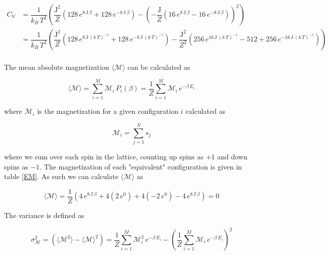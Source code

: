 \documentclass[a4paper, fontsize=11pt]{article}
\begin{document}
\begin{align}
C_{V} &= \dfrac{1}{k_{B} \, T^2} \left( \dfrac{\text{J}^2}{Z} \left( 128 \, e^{8 \, \text{J} \, \beta} + 128 \, e^{-8 \, \text{J} \, \beta} \right) - \left(-\dfrac{\text{J}}{Z} \left(16 \, e^{8 \, \text{J} \, \beta} - 16 \, e^{-8 \, \text{J} \, \beta} \right) \right)^2 \right)
\\
&= 
\dfrac{1}{k_{B} \, T^2} \left( \dfrac{\text{J}^2}{Z} \left( 128 \, e^{8 \, \text{J} \, (k \, T)^{-1}} + 128 \, e^{-8 \, \text{J} \, (k \, T)^{-1}} \right) 
- 
\dfrac{\text{J}^2}{Z^2} \left(256 \, e^{16 \, \text{J} \, (k \, T)^{-1}} - 512 + 256 \, e^{-16 \, \text{J} \, (k \, T)^{-1}} \right) \right) 
\end{align}



\paragraph{}
The mean absolute magnetization $\langle \mathcal{M} \rangle$ can be calculated as

\begin{equation}
\langle \mathcal{M} \rangle = \sum^M_{i=1} \mathcal{M}_{i} \, P_{i}(\beta) = \dfrac{1}{Z} \sum^M_{i=1} \mathcal{M}_{i} \, e^{-\beta \, E_{i}}
\end{equation}

where $\mathcal{M}_{i}$ is the magnetization for a given configuration $i$ calculated as

\begin{equation}
\mathcal{M}_{i} = \sum^N_{j=1} s_{j}
\end{equation}

where we sum over each spin in the lattice, counting up spins as $+1$ and down spins as $-1$. The magnetization of each "equivalent" configuration is given in table \ref{EM}. As such we can calculate $\langle \mathcal{M} \rangle$ as

\begin{equation}
\langle \mathcal{M} \rangle = \dfrac{1}{Z} \left( 4 \, e^{8 \, \text{J} \, \beta} + 4 (2 \, e^0) + 4 ( -2 \, e^0) -4 \, e^{8 \, \text{J} \, \beta} \right) = 0
\end{equation}

The variance is defined as 

\begin{equation}
\sigma^2_{\mathcal{M}} = \left( \langle \mathcal{M}^2 \rangle - \langle \mathcal{M} \rangle^2 \right) = \dfrac{1}{Z} \sum^M_{i=1} \mathcal{M}_{i}^2 \, e^{-\beta \, E_{i}} - \left( \dfrac{1}{Z} \sum^M_{i=1} \mathcal{M}_{i} \, e^{-\beta \, E_{i}} \right)^2
\end{equation}
\end{document}
